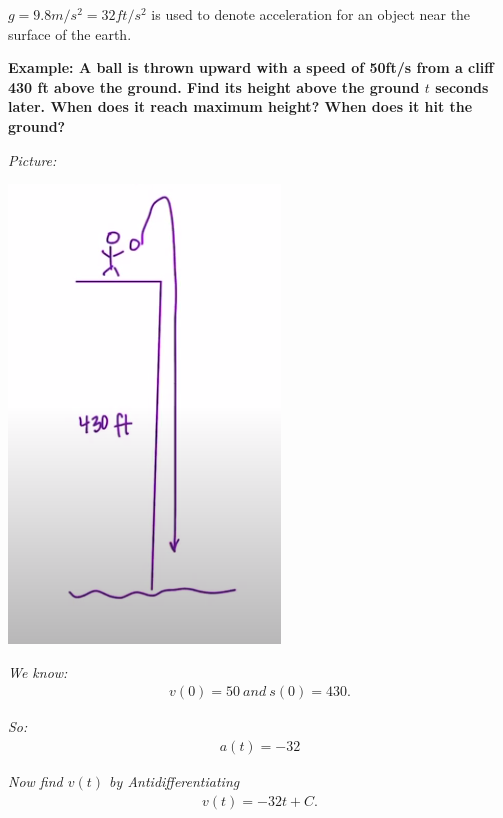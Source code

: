 \documentclass{report}
\begin{document}
  \pagebreak \bigbreak \noindent
  $g=9.8m/s^{2} = 32ft/s^{2}$ is used to denote acceleration for an object near the surface of the earth.

  \bigbreak \noindent 
  \begin{mdframed}
    \textbf{Example: A ball is thrown upward with a speed of 50ft/s from a cliff 430 ft
      above the ground. Find its height above the ground $t$ seconds later. When does it reach maximum height? When does it hit 
      the ground?
    }
  \end{mdframed}

  \bigbreak \noindent 
  \textit{Picture:}
  \begin{center}
    \includegraphics[scale=0.5]{./images/27.png}
  \end{center}

  \bigbreak \noindent 
  \textit{We know:}
  \begin{align*}
    v(0) = 50\ and\ s(0) = 430
  .\end{align*}

  \bigbreak \noindent
  \textit{So:}
  \begin{align*}
    a(t) = -32
  \end{align*}

  \bigbreak \noindent 
  \textit{Now find $v(t)$ by Antidifferentiating}
  \begin{align*}
    v(t) = -32t + C 
  .\end{align*}
\end{document}
